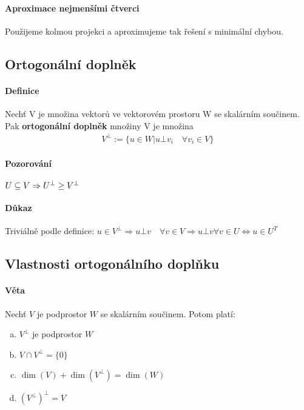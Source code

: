 \documentclass[a4paper,10pt]{article}
\begin{document}
\paragraph{Aproximace nejmenšími čtverci}
Použijeme kolmou projekci a aproximujeme tak řešení s minimální chybou.

\subsection{Ortogonální doplněk}
\setcounter{equation}{0}
\paragraph{Definice}
Nechť V je množina vektorů ve vektorovém prostoru W se skalárním součinem. Pak
\textbf{ortogonální doplněk} množiny V je množina
\begin{align*}
	V^\bot := \{u \in W | u \bot v_i \quad \forall v_i \in V\}
\end{align*}
\paragraph{Pozorování}
$U \subseteq V \Rightarrow U^\bot \ge V^\bot$
\paragraph{Důkaz}
Triviálně podle definice:
$u \in V^\bot \Rightarrow u \bot v \quad \forall v \in V \Rightarrow u \bot v
\forall v \in U \Leftrightarrow u \in U^T$


\subsection{Vlastnosti ortogonálního doplňku}
\setcounter{equation}{0}
\paragraph{Věta}
Nechť $V$ je podprostor $W$ se skalárním součinem. Potom platí:
\begin{enumerate}[a)]
	\item $V^\bot$ je podprostor $W$
	\item $V \cap V^\bot = \{ 0 \}$
	\item $\dim(V) + \dim(V^\bot) = \dim(W)$
	\item $(V^\bot)^\bot = V$
\end{enumerate}
\end{document}
